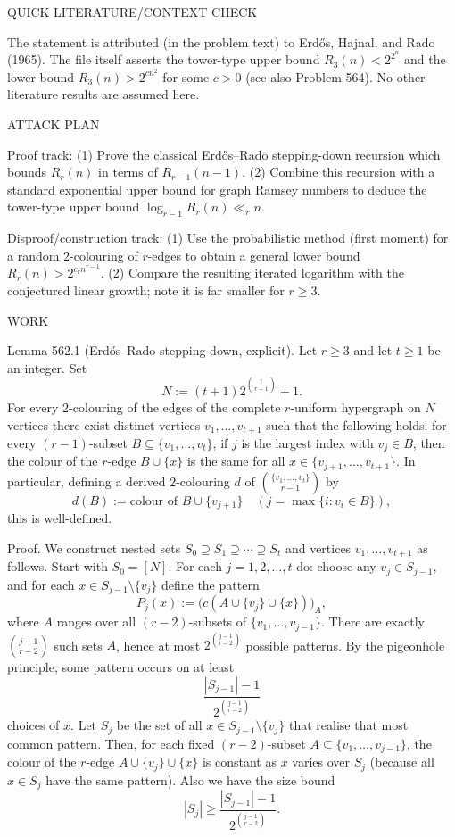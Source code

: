 QUICK LITERATURE/CONTEXT CHECK

The statement is attributed (in the problem text) to Erd\H{o}s, Hajnal, and Rado (1965). The file itself asserts the tower-type upper bound $R_3(n) < 2^{2^{n}}$ and the lower bound $R_3(n) > 2^{c n^2}$ for some $c>0$ (see also Problem 564). No other literature results are assumed here.

ATTACK PLAN

Proof track:
(1) Prove the classical Erd\H{o}s--Rado stepping-down recursion which bounds $R_r(n)$ in terms of $R_{r-1}(n-1)$.
(2) Combine this recursion with a standard exponential upper bound for graph Ramsey numbers to deduce the tower-type upper bound $\log_{r-1} R_r(n) \ll_r n$.

Disproof/construction track:
(1) Use the probabilistic method (first moment) for a random $2$-colouring of $r$-edges to obtain a general lower bound $R_r(n) > 2^{c_r n^{r-1}}$.
(2) Compare the resulting iterated logarithm with the conjectured linear growth; note it is far smaller for $r\ge 3$.

WORK

Lemma 562.1 (Erd\H{o}s--Rado stepping-down, explicit).
Let $r\ge 3$ and let $t\ge 1$ be an integer. Set
\[
N := (t+1) 2^{\binom{t}{r-1}} + 1.
\]
For every $2$-colouring of the edges of the complete $r$-uniform hypergraph on $N$ vertices there exist distinct vertices
$v_1,\dots,v_{t+1}$ such that the following holds:
for every $(r-1)$-subset $B\subseteq\{v_1,\dots,v_t\}$, if $j$ is the largest index with $v_j\in B$, then the colour of the $r$-edge
$B\cup\{x\}$ is the same for all $x\in\{v_{j+1},\dots,v_{t+1}\}$.
In particular, defining a derived $2$-colouring $d$ of $\binom{\{v_1,\dots,v_t\}}{r-1}$ by
\[
d(B) := \text{colour of } B\cup\{v_{j+1}\} \quad (j=\max\{i: v_i\in B\}),
\]
this is well-defined.

Proof.
We construct nested sets $S_0\supseteq S_1\supseteq\cdots\supseteq S_t$ and vertices $v_1,\dots,v_{t+1}$ as follows.
Start with $S_0=[N]$.
For each $j=1,2,\dots,t$ do:
choose any $v_j\in S_{j-1}$, and for each $x\in S_{j-1}\setminus\{v_j\}$ define the pattern
\[
P_j(x) := \bigl( c(A\cup\{v_j\}\cup\{x\}) \bigr)_{A},
\]
where $A$ ranges over all $(r-2)$-subsets of $\{v_1,\dots,v_{j-1}\}$. There are exactly $\binom{j-1}{r-2}$ such sets $A$, hence at most
$2^{\binom{j-1}{r-2}}$ possible patterns.
By the pigeonhole principle, some pattern occurs on at least
\[
\frac{|S_{j-1}|-1}{2^{\binom{j-1}{r-2}}}
\]
choices of $x$. Let $S_j$ be the set of all $x\in S_{j-1}\setminus\{v_j\}$ that realise that most common pattern.
Then, for each fixed $(r-2)$-subset $A\subseteq\{v_1,\dots,v_{j-1}\}$, the colour of the $r$-edge $A\cup\{v_j\}\cup\{x\}$ is
constant as $x$ varies over $S_j$ (because all $x\in S_j$ have the same pattern).
Also we have the size bound
\[
|S_j| \ge \frac{|S_{j-1}|-1}{2^{\binom{j-1}{r-2}}}.
\]

